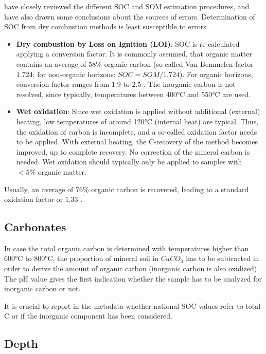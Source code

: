 \documentclass[10pt,b5paper,]{book}
\theoremstyle{definition}
\theoremstyle{definition}
\theoremstyle{definition}
\theoremstyle{remark}
\begin{document}
\cite{rosell2001soil} have closely reviewed the different SOC and SOM
estimation procedures, and have also drawn some conclusions about the
sources of errors. Determination of SOC from dry combustion methods is
least susceptible to errors.

\begin{itemize}
\item
  \textbf{Dry combustion by Loss on Ignition (LOI)}: SOC is
  re-calculated applying a conversion factor. It is commonly assumed,
  that organic matter contains an average of \(58\%\) organic carbon
  (so-called Van Bemmelen factor \(1.724\); for non-organic horizons:
  \(SOC = SOM / 1.724\)). For organic horizons, conversion factor ranges
  from \(1.9\) to \(2.5\) \citep{nelson1982total}. The inorganic carbon
  is not resolved, since typically, temperatures between 400°C and 550°C
  are used.
\item
  \textbf{Wet oxidation}: Since wet oxidation is applied without
  additional (external) heating, low temperatures of around 120°C
  (internal heat) are typical. Thus, the oxidation of carbon is
  incomplete, and a so-called oxidation factor needs to be applied. With
  external heating, the C-recovery of the method becomes improved, up to
  complete recovery. No correction of the mineral carbon is needed. Wet
  oxidation should typically only be applied to samples with \(<5\%\)
  organic matter.
\end{itemize}

Usually, an average of \(76\%\) organic carbon is recovered, leading to
a standard oxidation factor or \(1.33\) \citep{lettens2005soil}.

\hypertarget{carbonates}{%
\subsection{Carbonates}\label{carbonates}}

In case the total organic carbon is determined with temperatures higher
than 600°C to 800°C, the proportion of mineral soil in \(CaCO_3\) has to
be subtracted in order to derive the amount of organic carbon (inorganic
carbon is also oxidized). The pH value gives the first indication
whether the sample has to be analyzed for inorganic carbon or not.

It is crucial to report in the metadata whether national SOC values
refer to total C or if the inorganic component has been considered.

\hypertarget{depth}{%
\subsection{Depth}\label{depth}}
\end{document}
